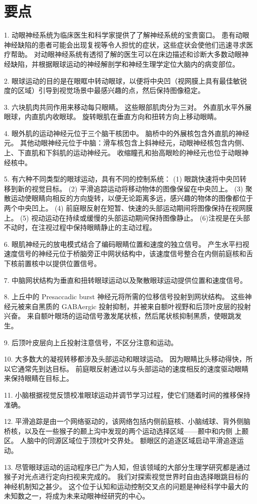 \section{要点}
1. 动眼神经系统为临床医生和科学家提供了了解神经系统的宝贵窗口。 患有动眼神经缺陷的患者可能会出现复视等令人担忧的症状，这些症状会使他们迅速寻求医疗帮助。 对动眼神经系统有透彻了解的医生可以在床边描述和诊断大多数动眼神经缺陷，并根据眼球运动的神经解剖学和神经生理学定位大脑内的病变部位。

2. 眼球运动的目的是在眼眶中转动眼球，以便将中央凹（视网膜上具有最佳敏锐度的区域）引导到视觉场景中最感兴趣的点，然后保持图像稳定。

3. 六块肌肉共同作用来移动每只眼睛。 这些眼部肌肉分为三对。 外直肌水平外展眼球，内直肌内收眼球。 旋转眼肌在垂直方向和扭转方向上移动眼睛。

4. 眼外肌的运动神经元位于三个脑干核团中。 脑桥中的外展核包含外直肌的神经元。 其他动眼神经元位于中脑：滑车核包含上斜神经元，动眼神经核包含内侧、上、下直肌和下斜肌的运动神经元。 收缩瞳孔和抬高眼睑的神经元也位于动眼神经核中。

5. 有六种不同类型的眼球运动，具有不同的控制系统： (1) 眼跳快速将中央凹转移到新的视觉目标。 (2) 平滑追踪运动将移动物体的图像保留在中央凹上。 (3) 聚散运动使眼睛向相反的方向旋转，以便无论距离多远，感兴趣的物体的图像都位于两个中央凹上。 (4) 前庭眼反射在短暂、快速的头部运动期间将图像保持在视网膜上。 (5) 视动运动在持续或缓慢的头部运动期间保持图像静止。 (6)注视是在头部不动时，在注视过程中保持眼睛静止的主动过程。

6. 眼肌神经元的放电模式结合了编码眼睛位置和速度的独立信号。 产生水平扫视速度信号的神经元位于桥脑旁正中网状结构中，该速度信号整合在内侧前庭核和舌下核前置核中以提供位置信号。

7. 中脑网状结构为垂直和扭转眼球运动以及聚散眼球运动提供位置和速度信号。

8. 上丘中的 Presaccadic burst 神经元将所需的位移信号投射到网状结构。 这些神经元被来自黑质的 GABAergic 投射抑制，并被来自额叶视野和后顶叶皮层的投射兴奋。 来自额叶眼场的运动信号激发尾状核，然后尾状核抑制黑质，使眼跳发生。

9. 后顶叶皮层向上丘投射注意信号，不区分注意和运动。

10. 大多数大的凝视转移都涉及头部运动和眼球运动。 因为眼睛比头移动得快，所以它通常先到达目标。 前庭眼反射通过以与头部运动的速度相反的速度驱动眼睛来保持眼睛在目标上。

11. 小脑根据视觉反馈校准眼球运动并调节学习过程，使它们随着时间的推移保持准确。

12. 平滑追踪是由一个网络驱动的，该网络包括内侧前庭核、小脑绒球、背外侧脑桥核，以及在一些猴子的颞上沟中发现的两个运动选择区域——颞中和内侧 上颞区。 人脑中的同源区域位于顶枕叶交界处。 额眼区的追逐区域启动平滑追逐运动。

13. 尽管眼球运动的运动程序已广为人知，但该领域的大部分生理学研究都是通过猴子对光点进行定向扫视来完成的。 我们对探索视觉世界时自由选择眼跳目标的神经机制知之甚少。 这个位于认知和运动控制交叉点的问题是神经科学中最大的未知数之一，将成为未来动眼神经研究的中心。




